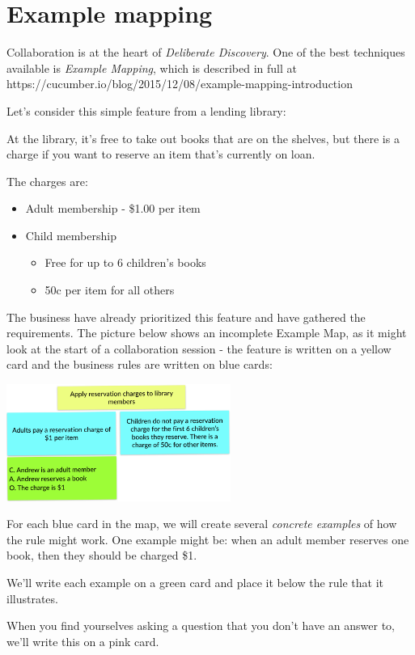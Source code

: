 \chapter*{Example mapping}

\ifcontent
    Collaboration is at the heart of \emph{Deliberate Discovery}. One of the best techniques available is \emph{Example Mapping}, which is described in full at https://cucumber.io/blog/2015/12/08/example-mapping-introduction
    
    Let's consider this simple feature from a lending library:
    
    \begin{framed}
        At the library, it's free to take out books that are on the shelves, but there is a charge if you want to reserve an item that's currently on loan.
    
        The charges are:
    
        \begin{itemize}
            \item Adult membership - \$1.00 per item
            \item Child membership
                \begin{itemize}
                    \item Free for up to 6 children's books
                    \item 50c per item for all others
                \end{itemize}
        \end{itemize}
    \end{framed}
    
    The business have already prioritized this feature and have gathered the requirements. The picture below shows an incomplete Example Map, as it might look at the start of a collaboration session - the feature is written on a yellow card and the business rules are written on blue cards:
    
    \begin{center}
        \includegraphics[width=0.55\textwidth, keepaspectratio]{images/library-example-map}
    \end{center}
    
    For each blue card in the map, we will create several \emph{concrete examples} of how the rule might work. One example might be: when an adult member reserves one book, then they should be charged \$1.
    
    We'll write each example on a green card and place it below the rule that it illustrates. 
    
    When you find yourselves asking a question that you don't have an answer to, we'll write this on a pink card.
    
\fi 
